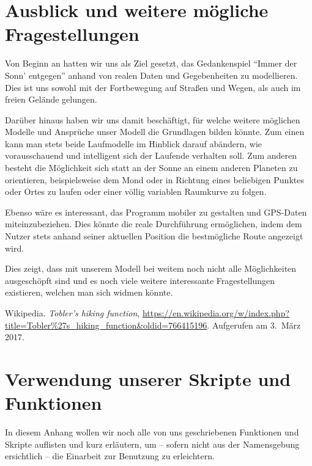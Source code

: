 \documentclass[
    paper=a4,
    DIV14,
    fontsize=12pt,
    pagesize=pdftex,
    toc=bibliographynumbered
]{scrartcl}
\numberwithin{figure}{section}
\numberwithin{equation}{section}
\numberwithin{table}{section}
\begin{document}
\section{Ausblick und weitere mögliche Fragestellungen}

Von Beginn an hatten wir uns als Ziel gesetzt, das Gedankenspiel \enquote{Immer der Sonn'
entgegen} anhand von realen Daten und Gegebenheiten zu modellieren. Dies ist uns sowohl
mit der Fortbewegung auf Straßen und Wegen, als auch im freien Gelände gelungen.

Darüber hinaus haben wir uns damit beschäftigt, für welche weitere möglichen Modelle und
Ansprüche unser Modell die Grundlagen bilden könnte. Zum einen kann man stets beide
Laufmodelle im Hinblick darauf abändern, wie vorausschauend und intelligent sich der
Laufende verhalten soll. Zum anderen besteht die Möglichkeit sich statt an der Sonne an
einem anderen Planeten zu orientieren, beispielsweise dem Mond oder in Richtung eines
beliebigen Punktes oder Ortes zu laufen oder einer völlig variablen Raumkurve zu folgen.

Ebenso wäre es interessant, das Programm mobiler zu gestalten und GPS-Daten
miteinzubeziehen. Dies könnte die reale Durchführung ermöglichen, indem dem Nutzer stets
anhand seiner aktuellen Position die bestmögliche Route angezeigt wird.

Dies zeigt, dass mit unserem Modell bei weitem noch nicht alle Möglichkeiten ausgeschöpft
sind und es noch viele weitere interessante Fragestellungen existieren, welchen man sich
widmen könnte.

\begin{thebibliography}{3}
        Wikipedia.
        \emph{Tobler's hiking function},
        \url{https://en.wikipedia.org/w/index.php?title=Tobler%27s_hiking_function&oldid=766415196}.
        Aufgerufen am 3.\ März 2017.
\end{thebibliography}

\appendix
\section{Verwendung unserer Skripte und Funktionen}
In diesem Anhang wollen wir noch alle von uns geschriebenen Funktionen und Skripte
auflisten und kurz erläutern, um -- sofern nicht aus der Namensgebung ersichtlich -- die
Einarbeit zur Benutzung zu erleichtern.
\end{document}
